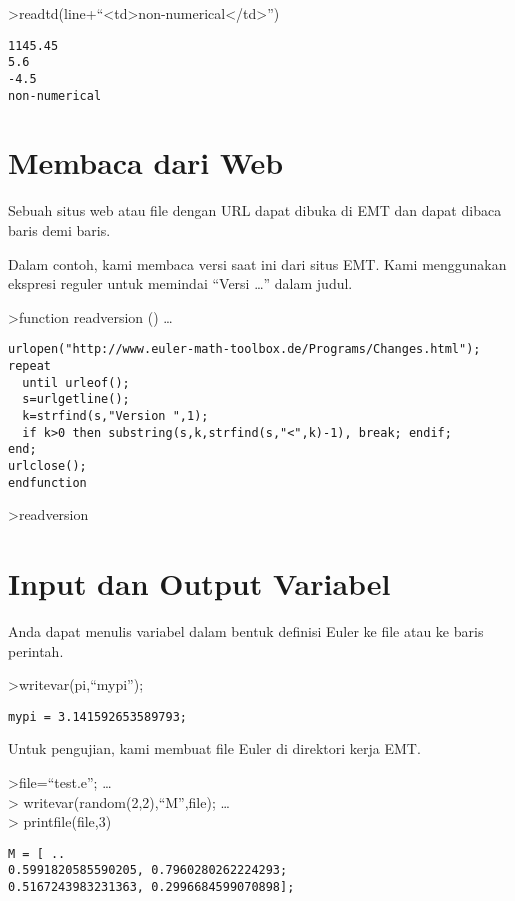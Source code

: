 \documentclass[
]{book}
\begin{document}
\textgreater readtd(line+``\textless td\textgreater non-numerical\textless/td\textgreater{}'')

\begin{verbatim}
1145.45
5.6
-4.5
non-numerical
\end{verbatim}

\chapter{Membaca dari Web}\label{membaca-dari-web}

Sebuah situs web atau file dengan URL dapat dibuka di EMT dan dapat dibaca baris demi baris.

Dalam contoh, kami membaca versi saat ini dari situs EMT. Kami menggunakan ekspresi reguler untuk memindai ``Versi \ldots{}'' dalam judul.

\textgreater function readversion () \ldots{}

\begin{verbatim}
urlopen("http://www.euler-math-toolbox.de/Programs/Changes.html");
repeat
  until urleof();
  s=urlgetline();
  k=strfind(s,"Version ",1);
  if k>0 then substring(s,k,strfind(s,"<",k)-1), break; endif;
end;
urlclose();
endfunction
\end{verbatim}

\textgreater readversion

\chapter{Input dan Output Variabel}\label{input-dan-output-variabel}

Anda dapat menulis variabel dalam bentuk definisi Euler ke file atau ke baris perintah.

\textgreater writevar(pi,``mypi'');

\begin{verbatim}
mypi = 3.141592653589793;
\end{verbatim}

Untuk pengujian, kami membuat file Euler di direktori kerja EMT.

\textgreater file=``test.e''; \ldots{}\\
\textgreater{} writevar(random(2,2),``M'',file); \ldots{}\\
\textgreater{} printfile(file,3)

\begin{verbatim}
M = [ ..
0.5991820585590205, 0.7960280262224293;
0.5167243983231363, 0.2996684599070898];
\end{verbatim}
\end{document}
